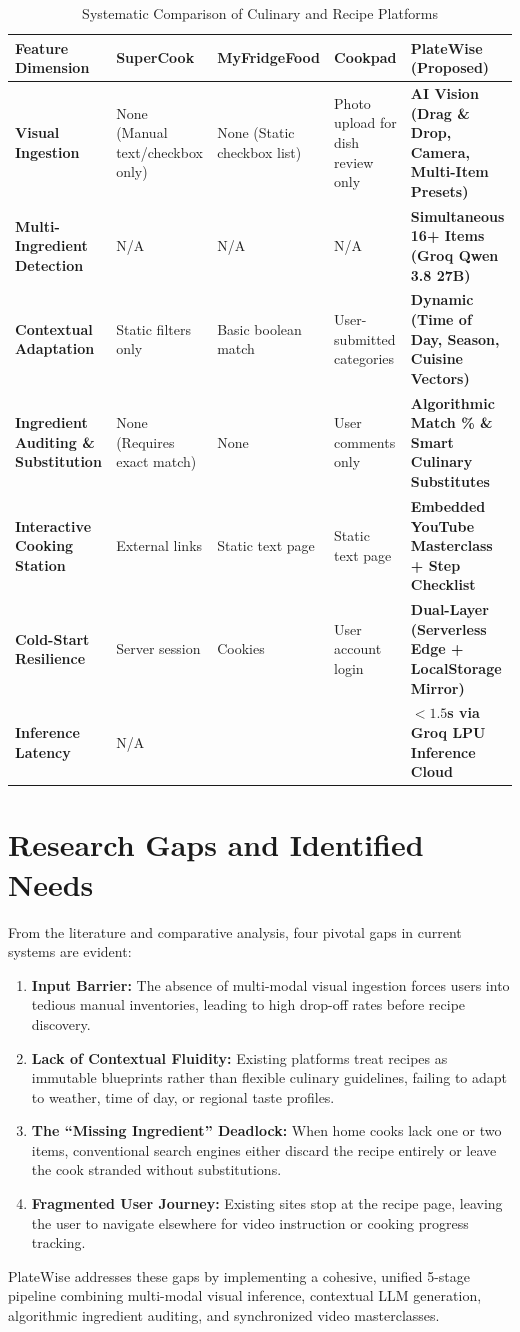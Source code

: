 \begin{table}[H]
\centering
\caption{Systematic Comparison of Culinary and Recipe Platforms}
\label{tab:comparison}
\begin{tabular}{|p{3.2cm}|p{2.3cm}|p{2.3cm}|p{2.3cm}|p{3.2cm}|}
\hline
\textbf{Feature Dimension} & \textbf{SuperCook} & \textbf{MyFridgeFood} & \textbf{Cookpad} & \textbf{PlateWise (Proposed)} \\ \hline
\textbf{Visual Ingestion} & None (Manual text/checkbox only) & None (Static checkbox list) & Photo upload for dish review only & \textbf{AI Vision (Drag \& Drop, Camera, Multi-Item Presets)} \\ \hline
\textbf{Multi-Ingredient Detection} & N/A & N/A & N/A & \textbf{Simultaneous 16+ Items (Groq Qwen 3.8 27B)} \\ \hline
\textbf{Contextual Adaptation} & Static filters only & Basic boolean match & User-submitted categories & \textbf{Dynamic (Time of Day, Season, Cuisine Vectors)} \\ \hline
\textbf{Ingredient Auditing \& Substitution} & None (Requires exact match) & None & User comments only & \textbf{Algorithmic Match \% \& Smart Culinary Substitutes} \\ \hline
\textbf{Interactive Cooking Station} & External links & Static text page & Static text page & \textbf{Embedded YouTube Masterclass + Step Checklist} \\ \hline
\textbf{Cold-Start Resilience} & Server session & Cookies & User account login & \textbf{Dual-Layer (Serverless Edge + LocalStorage Mirror)} \\ \hline
\textbf{Inference Latency} & N/A & & & \textbf{$< 1.5$s via Groq LPU Inference Cloud} \\ \hline
\end{tabular}
\end{table}

\section{Research Gaps and Identified Needs}
From the literature and comparative analysis, four pivotal gaps in current systems are evident:
\begin{enumerate}
    \item \textbf{Input Barrier:} The absence of multi-modal visual ingestion forces users into tedious manual inventories, leading to high drop-off rates before recipe discovery.
    \item \textbf{Lack of Contextual Fluidity:} Existing platforms treat recipes as immutable blueprints rather than flexible culinary guidelines, failing to adapt to weather, time of day, or regional taste profiles.
    \item \textbf{The “Missing Ingredient” Deadlock:} When home cooks lack one or two items, conventional search engines either discard the recipe entirely or leave the cook stranded without substitutions.
    \item \textbf{Fragmented User Journey:} Existing sites stop at the recipe page, leaving the user to navigate elsewhere for video instruction or cooking progress tracking.
\end{enumerate}

PlateWise addresses these gaps by implementing a cohesive, unified 5-stage pipeline combining multi-modal visual inference, contextual LLM generation, algorithmic ingredient auditing, and synchronized video masterclasses.
